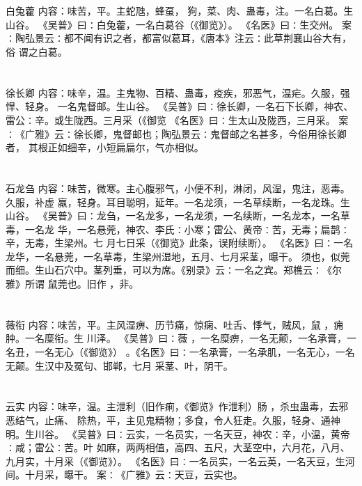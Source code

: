 \documentclass[12pt,UTF8]{ctexbook}
\begin{document}
\chapter{}白兔藿
内容：味苦，平。主蛇虺，蜂虿， 狗，菜、肉、蛊毒，注。一名白葛。生山谷。 
《吴普》曰∶白兔藿，一名白葛谷（《御览》）。 
《名医》曰∶生交州。 
案∶陶弘景云∶都不闻有识之者，都富似葛耳，《唐本》注云∶此草荆襄山谷大有，俗 
谓之白葛。 


\chapter{}徐长卿
内容：味辛，温。主鬼物、百精、蛊毒，疫疾，邪恶气，温疟。久服，强悍、轻身。 
一名鬼督邮。生山谷。 
《吴普》曰∶徐长卿，一名石下长卿，神农、雷公∶辛。或生陇西。三月采（《御览 
《名医》曰∶生太山及陇西，三月采。 
案∶《广雅》云∶徐长卿，鬼督邮也；陶弘景云∶鬼督邮之名甚多，今俗用徐长卿者， 
其根正如细辛，小短扁扁尔，气亦相似。 


\chapter{}石龙刍
内容：味苦，微寒。主心腹邪气，小便不利，淋闭，风湿，鬼注，恶毒。久服，补虚 
羸，轻身。耳目聪明，延年。一名龙须，一名草续断，一名龙珠。生山谷。 
《吴普》曰∶龙刍，一名龙多，一名龙须，一名续断，一名龙本，一名草毒，一名龙 
华，一名悬莞，神农、李氏∶小寒；雷公、黄帝∶苦，无毒；扁鹊∶辛，无毒，生梁州。七 
月七日采（《御览》此条，误附续断）。 
《名医》曰∶一名龙华，一名悬莞，一名草毒，生梁州湿地，五月、七月采茎，曝干。 
须也，似莞而细。生山石穴中。茎列垂，可以为席。《别录》云∶一名之宾。郑樵云∶《尔 
雅》所谓 鼠莞也。旧作 ，非。 


\chapter{}薇衔
内容：味苦，平。主风湿痹、历节痛，惊痫、吐舌、悸气，贼风，鼠 ，痈肿。一名糜衔。生 
川泽。 
《吴普》曰∶薇 ，一名糜痹，一名无颠，一名承膏，一名丑，一名无心（《御览》） 
。《名医》曰∶一名承膏，一名承肌，一名无心，一名无颠。生汉中及冤句、邯郸，七月 
采茎、叶，阴干。 


\chapter{}云实
内容：味辛，温。主泄利（旧作痢，《御览》作泄利）肠 ，杀虫蛊毒，去邪恶结气，止痛、 
除热，平，主见鬼精物；多食，令人狂走。久服，轻身、通神明。生川谷。 
《吴普》曰∶云实，一名员实，一名天豆，神农∶辛，小温，黄帝∶咸；雷公∶苦。叶 
如麻，两两相值，高四、五尺，大茎空中，六月花，八月、九月实，十月采（《御览》）。 
《名医》曰∶一名员实，一名云英，一名天豆，生河间。十月采，曝干。 
案∶《广雅》云∶天豆，云实也。 
\end{document}
